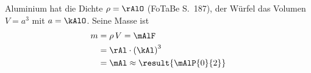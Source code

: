 Aluminium hat die Dichte $\rho = \rAlO$ (FoTaBe S.~187), der Würfel das Volumen $V = a^3$ mit $a = \kAlO$. Seine Masse ist
\begin{align}
 m &= \rho\,V = \mAlF \\
   &= \rAl\cdot\left(\kAl\right)^3 \\
   &= \mAl \approx \result{\mAlP{0}{2}}
\end{align}

